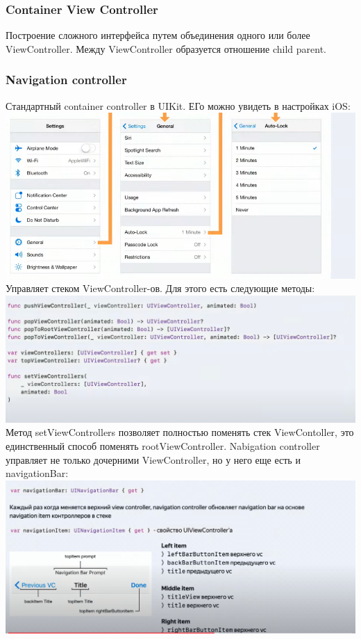 \documentclass{article}
\begin{document}
    \subsubsection{Container View Controller}
    Построение сложного интерфейса путем объединения одного или более ViewController. Между ViewController образуется отношение child parent. 
    \subsubsection{Navigation controller}
    Стандартный container controller в UIKit. ЕГо можно увидеть в настройках iOS:
    \newline
    \includegraphics[scale = 0.5]{pic/Снимок экрана 2023-08-03 в 10.57.46.png}
    \newline
    Управляет стеком ViewController-ов. Для этого есть следующие методы: 
    \newline
    \includegraphics[scale = 0.5]{pic/Снимок экрана 2023-08-03 в 10.58.24.png}
    \newline
    Метод setViewControllers позволяет полностью поменять стек ViewContoller, это единственный способ поменять rootViewController.
    \newline
    Nabigation controller управляет не только дочерними ViewController, но у него еще есть и navigationBar:
    \newline
    \includegraphics[scale = 0.3]{pic/Снимок экрана 2023-08-03 в 11.02.45.png}
\end{document}
